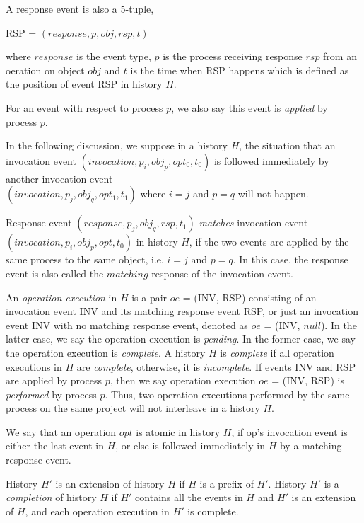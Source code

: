 A response event is also a 5-tuple,
\begin{center}
RSP = $(response, p, obj, rsp, t)$
\end{center}
where $response$ is the event type, $p$ is the process receiving response $rsp$ from an oeration on object $obj$ and $t$
is the time when RSP happens which is defined as the position of event RSP in history $H$.

For an event with respect to
process $p$, we also say this event is \emph{applied} by process $p$.

In the following discussion, we suppose in a history $H$, the situation that an invocation event
$(invocation, p_i, obj_p, opt_0, t_0)$ is followed immediately by another invocation event\\
$(invocation, p_j, obj_q, opt_1, t_1)$ where $i = j$ and $p = q$ will not happen.

Response event $(response, p_j, obj_q, rsp, t_1)$ \emph{matches} invocation event $(invocation, p_i, obj_p, opt, t_0)$
in history $H$, if the two events are applied by the same process to the same object, i.e, $i = j$ and $p = q$.
In this case, the response event is also called the $matching$ response of the invocation event.

An \emph{operation execution} in $H$ is a pair $oe$ = (INV, RSP) consisting of an invocation event INV
and its matching response event RSP, or just an invocation event INV with no matching response event,
denoted as $oe$ = (INV, $null$).
In the latter case, we say the operation execution is \emph{pending}. In the former case, we say the operation
execution is \emph{complete}. A history $H$ is \emph{complete} if all operation executions in $H$ are \emph{complete},
otherwise, it is \emph{incomplete}. If events INV and RSP are applied by process $p$, then we say
operation execution $oe$ = (INV, RSP) is \emph{performed} by process $p$. Thus, two operation
executions performed by the same process on the same project will not interleave in a history $H$.

We say that an operation $opt$ is atomic in history $H$, if op’s invocation event is either the last event in
$H$, or else is followed immediately in $H$ by a matching response event.

History $H'$ is an extension of history $H$ if $H$ is a prefix of $H'$.
History $H'$ is a \emph{completion} of history $H$ if $H'$ contains all the
events in $H$ and $H'$ is an extension of $H$, and each operation execution in $H'$ is complete.

